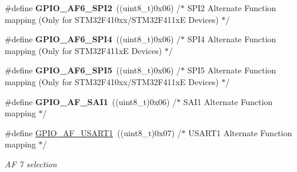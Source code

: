 \begin{DoxyCompactItemize}
\mbox{\label{group___g_p_i_o___alternat__function__selection__define_ga1da9c47feac80dcd9b9b9e3ca0d8f07e}} 
\#define {\bfseries G\+P\+I\+O\+\_\+\+A\+F6\+\_\+\+S\+P\+I2}~((uint8\+\_\+t)0x06)  /$\ast$ S\+P\+I2 Alternate Function mapping (\+Only for S\+T\+M32\+F410xx/\+S\+T\+M32\+F411x\+E Devices) $\ast$/
\item 
\mbox{\label{group___g_p_i_o___alternat__function__selection__define_ga61df826c6b9185e99862164044f3f5de}} 
\#define {\bfseries G\+P\+I\+O\+\_\+\+A\+F6\+\_\+\+S\+P\+I4}~((uint8\+\_\+t)0x06)  /$\ast$ S\+P\+I4 Alternate Function mapping (\+Only for S\+T\+M32\+F411x\+E Devices) $\ast$/
\item 
\mbox{\label{group___g_p_i_o___alternat__function__selection__define_ga39e4784425d5ca059b708cfb66259585}} 
\#define {\bfseries G\+P\+I\+O\+\_\+\+A\+F6\+\_\+\+S\+P\+I5}~((uint8\+\_\+t)0x06)  /$\ast$ S\+P\+I5 Alternate Function mapping (\+Only for S\+T\+M32\+F410xx/\+S\+T\+M32\+F411x\+E Devices) $\ast$/
\item 
\mbox{\label{group___g_p_i_o___alternat__function__selection__define_ga63b0d8e634d97e67d8b1b5b67acf0981}} 
\#define {\bfseries G\+P\+I\+O\+\_\+\+A\+F\+\_\+\+S\+A\+I1}~((uint8\+\_\+t)0x06)  /$\ast$ S\+A\+I1 Alternate Function mapping      $\ast$/
\item 
\mbox{\label{group___g_p_i_o___alternat__function__selection__define_ga790e1f37e75f475cf09c211f566fb069}} 
\#define \mbox{\hyperlink{group___g_p_i_o___alternat__function__selection__define_ga790e1f37e75f475cf09c211f566fb069}{G\+P\+I\+O\+\_\+\+A\+F\+\_\+\+U\+S\+A\+R\+T1}}~((uint8\+\_\+t)0x07)  /$\ast$ U\+S\+A\+R\+T1 Alternate Function mapping  $\ast$/
\begin{DoxyCompactList}\small\item\em AF 7 selection ~\newline
 \end{DoxyCompactList}\item 
\mbox{\label{group___g_p_i_o___alternat__function__selection__define_ga5e74db1f4d0fc3527aa067093625171b}} 

\end{DoxyCompactItemize}
